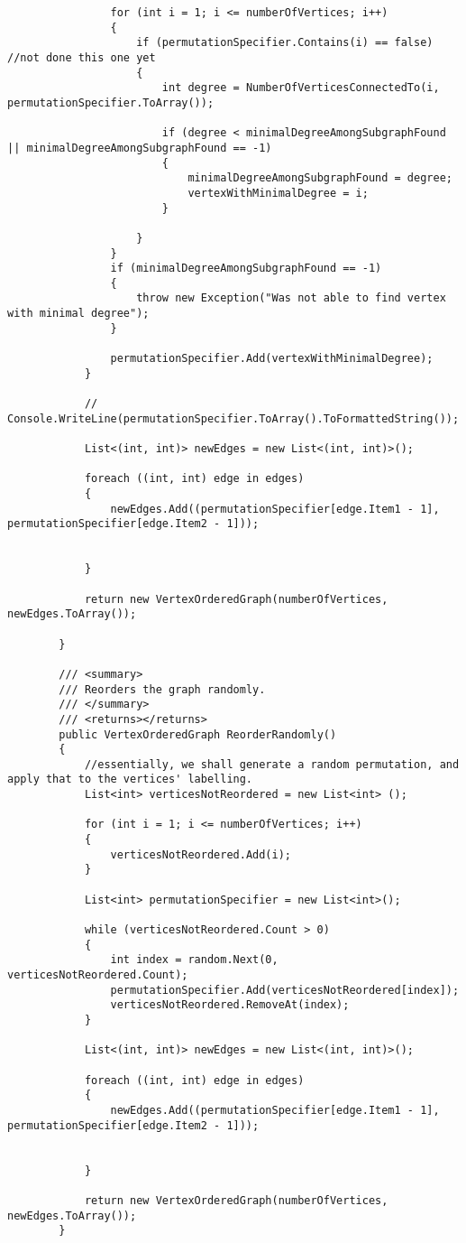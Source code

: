 \documentclass{article}
\begin{document}
\begin{lstlisting}
				for (int i = 1; i <= numberOfVertices; i++)
				{
					if (permutationSpecifier.Contains(i) == false) //not done this one yet
					{
						int degree = NumberOfVerticesConnectedTo(i, permutationSpecifier.ToArray());
						
						if (degree < minimalDegreeAmongSubgraphFound || minimalDegreeAmongSubgraphFound == -1)
						{
							minimalDegreeAmongSubgraphFound = degree;
							vertexWithMinimalDegree = i;
						}
						
					}
				}
				if (minimalDegreeAmongSubgraphFound == -1)
				{
					throw new Exception("Was not able to find vertex with minimal degree");
				}
				
				permutationSpecifier.Add(vertexWithMinimalDegree);
			}
			
			// Console.WriteLine(permutationSpecifier.ToArray().ToFormattedString());
			
			List<(int, int)> newEdges = new List<(int, int)>();
			
			foreach ((int, int) edge in edges)
			{
				newEdges.Add((permutationSpecifier[edge.Item1 - 1], permutationSpecifier[edge.Item2 - 1]));
				
				
			}
			
			return new VertexOrderedGraph(numberOfVertices, newEdges.ToArray());
			
		}
		
		/// <summary>
		/// Reorders the graph randomly.
		/// </summary>
		/// <returns></returns>
		public VertexOrderedGraph ReorderRandomly()
		{
			//essentially, we shall generate a random permutation, and apply that to the vertices' labelling.
			List<int> verticesNotReordered = new List<int> ();
			
			for (int i = 1; i <= numberOfVertices; i++)
			{
				verticesNotReordered.Add(i);
			}
			
			List<int> permutationSpecifier = new List<int>();
			
			while (verticesNotReordered.Count > 0)
			{
				int index = random.Next(0, verticesNotReordered.Count);
				permutationSpecifier.Add(verticesNotReordered[index]);
				verticesNotReordered.RemoveAt(index);
			}
			
			List<(int, int)> newEdges = new List<(int, int)>();
			
			foreach ((int, int) edge in edges)
			{
				newEdges.Add((permutationSpecifier[edge.Item1 - 1], permutationSpecifier[edge.Item2 - 1]));
				
				
			}
			
			return new VertexOrderedGraph(numberOfVertices, newEdges.ToArray());
		}
		

\end{lstlisting}
\end{document}
